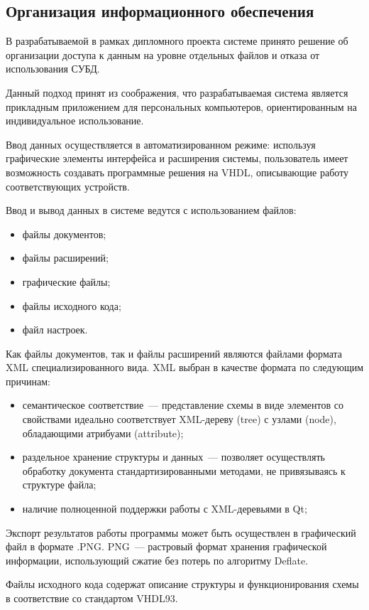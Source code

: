 \subsection{Организация информационного обеспечения}

В разрабатываемой в рамках дипломного проекта системе принято решение об организации доступа к данным на уровне отдельных файлов и отказа от использования СУБД.

Данный подход принят из соображения, что разрабатываемая система является прикладным приложением для персональных компьютеров, ориентированным на индивидуальное использование.

Ввод данных осуществляется в автоматизированном режиме: используя графические элементы интерфейса и расширения системы, пользователь имеет возможность создавать программные решения на VHDL, описывающие работу соответствующих устройств.

Ввод и вывод данных в системе ведутся с использованием файлов:
\begin{itemize}
  \item файлы документов;
  \item файлы расширений;
  \item графические файлы;
  \item файлы исходного кода;
  \item файл настроек.
\end{itemize}

Как файлы документов, так и файлы расширений являются файлами формата XML специализированного вида.
XML выбран в качестве формата по следующим причинам:
\begin{itemize}
  \item семантическое соответствие~--- представление схемы в виде элементов со свойствами идеально соответствует XML-дереву (tree) с узлами (node), обладающими атрибуами (attribute);
  \item раздельное хранение структуры и данных~--- позволяет осуществлять обработку документа стандартизированными методами, не привязываясь к структуре файла;
  \item наличие полноценной поддержки работы с XML-деревьями в Qt;
\end{itemize}

Экспорт результатов работы программы может быть осуществлен в графический файл в формате .PNG.
PNG~--- растровый формат хранения графической информации, использующий сжатие без потерь по алгоритму Deflate.

Файлы исходного кода содержат описание структуры и функционирования схемы в соответствие со стандартом VHDL93.

